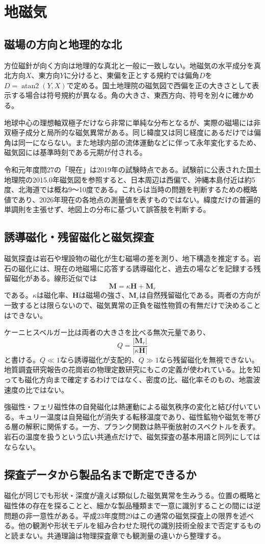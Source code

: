 \chapter{地磁気}
\section{磁場の方向と地理的な北}
\label{theory:geomagnetism:declination}
方位磁針が向く方向は地理的な真北と一般に一致しない。地磁気の水平成分を真北方向\(X\)、東方向\(Y\)に分けると、東偏を正とする規約では偏角\(D\)を\(D=\operatorname{atan2}(Y,X)\)で定める。国土地理院の磁気図で西偏を正の大きさとして表示する場合は符号規約が異なる。角の大きさ、東西方向、符号を別々に確かめる。

地球中心の理想軸双極子だけなら非常に単純な分布となるが、実際の磁場には非双極子成分と局所的な磁気異常がある。同じ緯度又は同じ経度にあるだけでは偏角は同一にならない。また地球内部の流体運動などに伴って永年変化するため、磁気図には基準時刻である元期が付される。

令和元年度問27の「現在」は2019年の試験時点である。試験前に公表された国土地理院の2015.0年磁気図を参照すると、日本周辺は西偏で、沖縄本島付近は約5度、北海道では概ね9〜10度である\cite{gsi_declination2015}。これらは当時の問題を判断するための概略値であり、2026年現在の各地点の測量値を表すものではない。緯度だけの普遍的単調則を主張せず、地図上の分布に基づいて誤答肢を判断する。

\section{誘導磁化・残留磁化と磁気探査}
\label{theory:geomagnetism:magnetization}
磁気探査は岩石や埋設物の磁化が生む磁場の差を測り、地下構造を推定する。岩石の磁化には、現在の地磁場に応答する誘導磁化と、過去の場などを記録する残留磁化がある。線形近似では
\[
 \boldsymbol{M}=\kappa\boldsymbol{H}+\boldsymbol{M}_r
\]
である。\(\kappa\)は磁化率、\(\boldsymbol{H}\)は磁場の強さ、\(\boldsymbol{M}_r\)は自然残留磁化である。両者の方向が一致するとは限らないので、磁気異常の正負を磁性物質の有無だけで決めることはできない。

ケーニヒスベルガー比は両者の大きさを比べる無次元量であり、
\[
 Q=\frac{|\boldsymbol{M}_r|}{|\kappa\boldsymbol{H}|}
\]
と書ける。\(Q\ll1\)なら誘導磁化が支配的、\(Q\gg1\)なら残留磁化を無視できない。地質調査研究報告の花崗岩の物理定数研究にもこの定義が使われている\cite{kanaya_okuma2011}。比を知っても磁化方向まで確定するわけではなく、密度の比、磁化率そのもの、地震波速度の比ではない。

強磁性・フェリ磁性体の自発磁化は熱運動による磁気秩序の変化と結び付いている。キュリー温度は自発磁化が消失する転移温度であり、磁性鉱物や磁気を帯びる層の解釈に関係する。一方、プランク関数は熱平衡放射のスペクトルを表す。岩石の温度を扱うという広い共通点だけで、磁気探査の基本用語と同列にしてはならない。

\section{探査データから製品名まで断定できるか}
磁化が同じでも形状・深度が違えば類似した磁気異常を生みうる。位置の概略と磁性体の存在を探ることと、細かな製品種類まで一意に識別することの間には逆問題の非一意性がある。平成23年度問29はこの通常の磁気探査上の限界を述べる。他の観測や形状モデルを組み合わせた現代の識別技術全般まで否定するものと読まない。共通理論は物理探査章でも観測量の違いから整理する。

